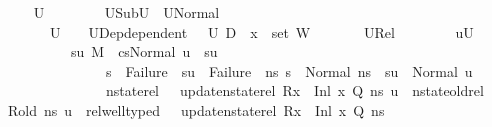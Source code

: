 \begin{isabellebody}
\ \ \isamarkupfalse%
\ U{}\ \ \isanewline
\ \ \ \ \ \ U{}Sub{\isacharcolon}{\kern0pt}{\isachardoublequoteopen}U{}\ {\isasymsubseteq}\ {\isacharquery}{\kern0pt}U{}Normal{\isachardoublequoteclose}\ \isanewline
\ \ \ \ \ \ {\isachardoublequoteopen}U{}\ {\isasymnoteq}\ {\isacharbraceleft}{\kern0pt}{\isacharbraceright}{\kern0pt}{\isachardoublequoteclose}\ \ U{}Dep{\isacharcolon}{\kern0pt}{\isachardoublequoteopen}dependent\ {\isasymLambda}{\isacharprime}{\kern0pt}\ {\isasymOmega}\ U{}\ {\isacharparenleft}{\kern0pt}D{}\ {\isasymunion}\ {\isacharbraceleft}{\kern0pt}x{}{\isacharbraceright}{\kern0pt}\ {\isasymunion}\ set\ W{\isacharparenright}{\kern0pt}{\isachardoublequoteclose}\ \isanewline
\ \ \ \ \ \ U{}Rel{\isacharcolon}{\kern0pt}\isanewline
\ \ \ \ \ \ \ \ {\isachardoublequoteopen}{\isasymforall}u{\isasymin}U{}{\isachardot}{\kern0pt}\isanewline
\ \ \ \ \ \ \ \ \ {\isasymexists}su{\isachardot}{\kern0pt}\ {\isacharparenleft}{\kern0pt}M{\isacharcomma}{\kern0pt}{\isasymLambda}{\isacharprime}{\kern0pt}{\isacharcomma}{\kern0pt}{\isasymGamma}{\isacharcomma}{\kern0pt}{\isasymOmega}\ {\isasymturnstile}\ {\isasymlangle}cs{\isacharcomma}{\kern0pt}Normal\ u{\isasymrangle}\ {\isacharbrackleft}{\kern0pt}{\isasymrightarrow}{\isacharbrackright}{\kern0pt}\ su{\isacharparenright}{\kern0pt}\ {\isasymand}\isanewline
\ \ \ \ \ \ \ \ \ \ \ \ \ \ {\isacharparenleft}{\kern0pt}s{\isacharprime}{\kern0pt}\ {\isacharequal}{\kern0pt}\ Failure\ {\isasymlongrightarrow}\ su\ {\isacharequal}{\kern0pt}\ Failure{\isacharparenright}{\kern0pt}\ {\isasymand}\ {\isacharparenleft}{\kern0pt}{\isasymforall}ns{\isacharprime}{\kern0pt}{\isachardot}{\kern0pt}\ s{\isacharprime}{\kern0pt}\ {\isacharequal}{\kern0pt}\ Normal\ ns{\isacharprime}{\kern0pt}\ {\isasymlongrightarrow}\ su\ {\isacharequal}{\kern0pt}\ Normal\ u\ {\isasymand}\isanewline
\ \ \ \ \ \ \ \ \ \ \ \ \ \ nstate{\isacharunderscore}{\kern0pt}rel\ {\isasymLambda}\ {\isasymLambda}{\isacharprime}{\kern0pt}\ {\isacharparenleft}{\kern0pt}update{\isacharunderscore}{\kern0pt}nstate{\isacharunderscore}{\kern0pt}rel\ {\isacharparenleft}{\kern0pt}R{\isacharparenleft}{\kern0pt}x\ {\isasymmapsto}\ Inl\ x{}{\isacharparenright}{\kern0pt}{\isacharparenright}{\kern0pt}\ Q{\isacharparenright}{\kern0pt}\ ns{\isacharprime}{\kern0pt}\ u\ {\isasymand}\ nstate{\isacharunderscore}{\kern0pt}old{\isacharunderscore}{\kern0pt}rel\ {\isasymLambda}\ {\isasymLambda}{\isacharprime}{\kern0pt}\ R{\isacharunderscore}{\kern0pt}old\ ns{\isacharprime}{\kern0pt}\ u\ {\isasymand}\ rel{\isacharunderscore}{\kern0pt}well{\isacharunderscore}{\kern0pt}typed\ {\isasymLambda}\ {\isasymOmega}\ {\isacharparenleft}{\kern0pt}update{\isacharunderscore}{\kern0pt}nstate{\isacharunderscore}{\kern0pt}rel\ {\isacharparenleft}{\kern0pt}R{\isacharparenleft}{\kern0pt}x\ {\isasymmapsto}\ Inl\ x{}{\isacharparenright}{\kern0pt}{\isacharparenright}{\kern0pt}\ Q{\isacharparenright}{\kern0pt}\ ns{\isacharprime}{\kern0pt}{\isacharparenright}{\kern0pt}{\isachardoublequoteclose}\isanewline

\end{isabellebody}
